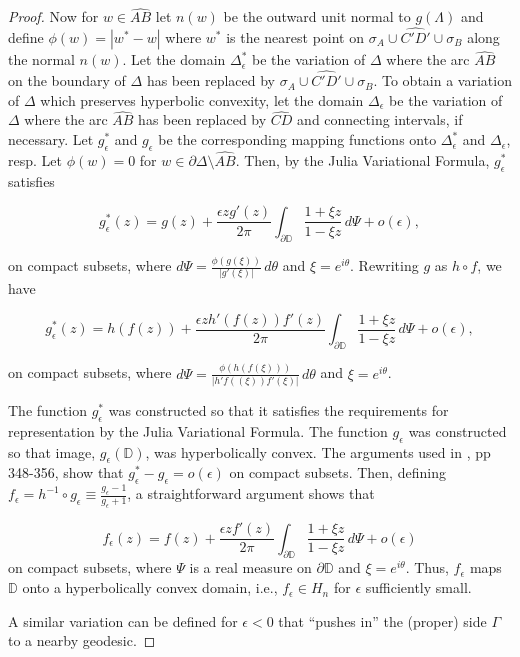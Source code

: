 \documentclass{lms}
\newcommand{\D}{\mathbb D}
\newcommand{\abs}[1]{\lvert#1\rvert}
\newcommand{\e}{\epsilon}
\numberwithin{equation}{section}
\begin{document}
\begin{proof}
Now for $w \in \widehat{AB}$ let $n(w)$ be the outward 
unit normal to $g(\Lambda)$ and define 
$\phi(w) = |w^*-w|$ where $w^*$ is the nearest point on 
$\sigma_A \cup \widehat{C'D'} \cup \sigma_B$
along the normal $n(w)$.  Let the domain $\Delta^*_{\e}$ 
be the variation of $\Delta$ where the
arc $\widehat{AB}$ on the boundary of $\Delta$ has been 
replaced by 
$\sigma_A \cup \widehat{C'D'} \cup \sigma_B$. To obtain a variation 
of $\Delta$ which preserves 
hyperbolic convexity, 
let the domain $\Delta_{\e}$ be the
variation of $\Delta$ where the arc $\widehat{AB}$ has been replaced by 
$\widehat{CD}$ and 
connecting intervals, if necessary.  Let $g^*_{\e}$ and $g_{\e}$
be the corresponding 
mapping functions
onto $\Delta_\e^*$ and $\Delta_\e$, resp.  Let $\phi(w) = 0$ for 
$w \in \partial \Delta \setminus \widehat{AB}$.
Then, by the Julia Variational Formula, $g^*_{\e}$ satisfies

\begin{equation*}
g^*_{\e}(z) = g(z)+\frac{\e z g'(z)}{2\pi}\int_{\partial \D}
\frac{1+\xi z}{1-\xi z}\,d\Psi + o(\e),
\end{equation*}

\noindent on compact subsets, 
where $d\Psi=\frac{\phi(g(\xi))}{\abs{g'(\xi)}}\,d\theta$ 
and $\xi=e^{i\theta}$. Rewriting $g$ as
$h \circ f$, we have

\begin{equation*}
g^*_{\e}(z) = h(f(z))+\frac{\e z h'(f(z))f'(z)}{2\pi}\int_{\partial \D}
\frac{1+\xi z}{1-\xi z}\,d\Psi + o(\e),
\end{equation*}

\noindent on compact subsets, 
where $d\Psi=\frac{\phi(h(f(\xi)))}
{\abs{h'f((\xi))f'(\xi)}}\,d\theta$ and $\xi=e^{i\theta}$. 

The function $g^*_{\e}$ was constructed so that it satisfies the 
requirements for representation by 
the Julia Variational Formula.  The function $g_{\e}$ was constructed 
so that image, $g_{\e}(\D)$, was 
hyperbolically convex.  The arguments used in \cite{BL75}, pp 348-356, 
show that $g^*_{\e} - g_{\e} = o(\e)$ on compact subsets.  Then, defining 
$f_{\e} = h^{-1} \circ g_{\e} \equiv \frac{g_{\e}-1}{g_{\e}+1}$, 
a straightforward 
argument shows that 

\begin{equation*}
f_\epsilon(z) = f(z)+\frac{\epsilon z f'(z)}{2\pi}\int_{\partial \D}
\frac{1+\xi z}{1-\xi z}\,d\Psi + o(\e)
\end{equation*}
on compact subsets, 
where $\Psi$ is a real measure on $\partial \D$ and $\xi=e^{i\theta}$.  
Thus, $f_{\e}$ maps $\D$
onto a hyperbolically convex domain, i.e., $f_{\e} \in H_n$ for 
$\e$ sufficiently small.

A similar variation can be defined for $\e < 0$ that ``pushes in'' the 
(proper) side $\Gamma$ to a nearby geodesic.

\end{proof}
\end{document}
